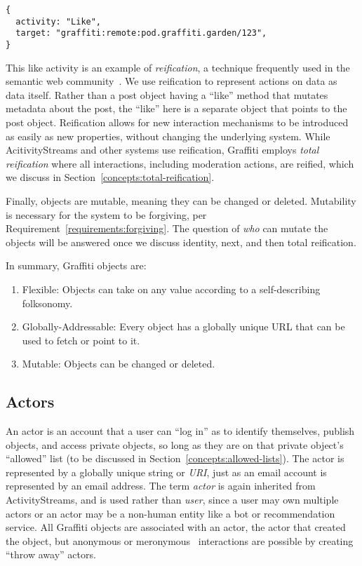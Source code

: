 \begin{verbatim}
{
  activity: "Like",
  target: "graffiti:remote:pod.graffiti.garden/123",
}
\end{verbatim}

This like activity is an example of \emph{reification},
a technique frequently used in the semantic web community~\cite{rdfprimer}.   We use reification to represent actions on data as data itself.
Rather than a post object having a ``like'' method that mutates metadata about the post,
the ``like'' here is a separate object that points to the post object.
Reification allows for new interaction mechanisms to be introduced as easily as new properties,
without changing the underlying system.
While AcitivityStreams and other systems use reification,
Graffiti employs \emph{total reification} where
all interactions, including moderation actions, are reified,
which we discuss in
Section~\ref{concepts:total-reification}.

Finally, objects are mutable, meaning they can be changed or deleted.
Mutability is necessary for the system to be forgiving, per Requirement~\ref{requirements:forgiving}.
The question of \emph{who} can mutate the objects
will be answered once we discuss identity, next, and then total reification.

In summary, Graffiti objects are:

\begin{enumerate}
\item
Flexible: Objects can take on any value according to a self-describing folksonomy.
\item
Globally-Addressable: Every object has a globally unique URL that can be used to fetch or point to it.
\item
Mutable: Objects can be changed or deleted.
\end{enumerate}

\subsection{Actors}
\label{concepts:actors}

An actor is an account that a user can ``log in'' as
to identify themselves, publish objects, and access private objects,
so long as they are on that private object's ``allowed'' list
(to be discussed in Section~{\ref{concepts:allowed-lists}}).
The actor is represented by a globally unique string or \emph{URI},
just as an email account is represented by an email address.
The term \emph{actor} is again inherited from ActivityStreams,
and is used rather than \emph{user}, since a user may own
multiple actors or
an actor may be a non-human entity
like a bot or recommendation service.
All Graffiti objects are associated with an actor, the actor
that created the object, but anonymous
or meronymous~\cite{meronymous} interactions are possible by
creating ``throw away'' actors.

